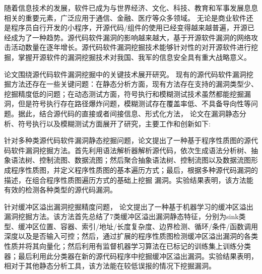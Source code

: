 \begin{cabstract}
随着信息技术的发展，软件已成为与世界经济、文化、科技、教育和军事发展息息相关的重要元素，广泛应用于通信、金融、医疗等众多领域。 %
无论是商业软件还是程序员自行开发的小程序，开源代码/组件的使用已经变得越来越普遍，开源已经成为了一种趋势。源代码软件漏洞的影响越来越大，基于开源软件漏洞的网络攻击活动数量在逐年增长。源代码软件漏洞挖掘技术能够针对性的对开源软件进行挖掘，掌握开源软件的漏洞挖掘技术对我国、我军的信息安全具有重大战略意义。

论文围绕源代码软件漏洞挖掘中的关键技术展开研究。%
现有的源代码软件漏洞挖掘方法还存在一些关键问题：在静态分析方面，现有方法存在支持的漏洞类型少、挖掘精度低的问题；在动态测试方面，符号执行和模糊测试技术虽然都能挖掘漏洞，但是符号执行存在路径爆炸问题，模糊测试存在覆盖率低、不具备导向性等问题。据此，结合源代码的直接或者间接信息、形式化方法，
论文在漏洞静态分析、符号执行以及模糊测试方面展开了研究，主要工作和创新如下:


针对多种类源代码软件漏洞静态挖掘问题，论文提出了一种基于程序性质图的源代码软件漏洞挖掘方法。首先利用语法解析器解析源代码，依次生成语法分析树、抽象语法树、控制流图、数据流图；然后聚合抽象语法树、控制流图以及数据流图形成程序性质图，并定义程序性质图的基本遍历方式；最后，根据多种源代码漏洞的描述，在组合程序性质图遍历方式的基础上挖掘
漏洞。实验结果表明，该方法能有效的检测各种类型的源代码漏洞。

针对缓冲区溢出漏洞挖掘精度问题，
论文提出了一种基于机器学习的缓冲区溢出漏洞挖掘方法。该方法首先总结了7类缓冲区溢出漏洞静态特征，分别为sink类型、缓冲区位置、容器、索引/地址/长度复杂度、边界检测、循环/条件/函数调用深度以及是否输入可控；然后，通过扩展的程序性质图检测缓冲区溢出漏洞的各类性质并将其向量化；然后利用有监督机器学习算法在已标记的训练集上训练分类器；最后利用此分类器在新的源代码程序中挖掘缓冲区溢出漏洞。实验结果表明，相对于其他静态分析工具，该方法能在较低误报的情况下挖掘漏洞。


\end{cabstract}
